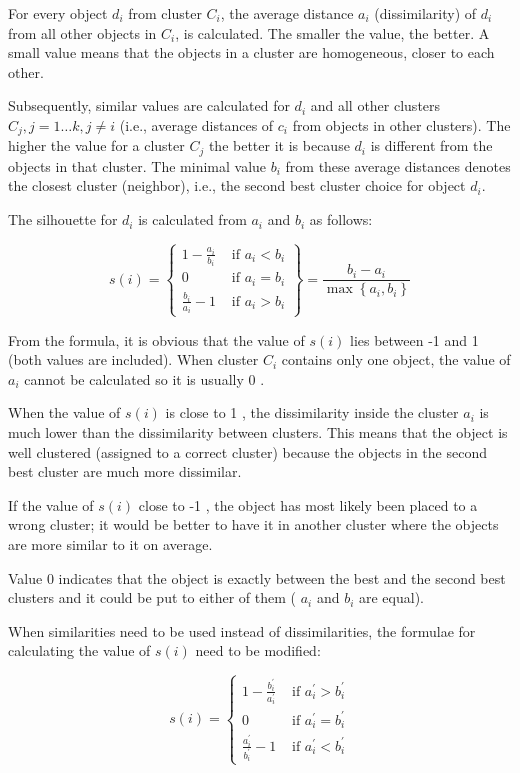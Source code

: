 \documentclass[10pt]{book}
\begin{document}
For every object $d_{i}$ from cluster $C_{i}$, the average distance $a_{i}$ (dissimilarity) of $d_{i}$ from all other objects in $C_{i}$, is calculated. The smaller the value, the better. A small value means that the objects in a cluster are homogeneous, closer to each other.

Subsequently, similar values are calculated for $d_{i}$ and all other clusters $C_{j}, j=1 \ldots k, j \neq i$ (i.e., average distances of $c_{i}$ from objects in other clusters). The higher the value for a cluster $C_{j}$ the better it is because $d_{i}$ is different from the objects in that cluster. The minimal value $b_{i}$ from these average distances denotes the closest cluster (neighbor), i.e., the second best cluster choice for object $d_{i}$.

The silhouette for $d_{i}$ is calculated from $a_{i}$ and $b_{i}$ as follows:

\[
s(i)=\left\{\begin{array}{ll}
1-\frac{a_{i}}{b_{i}} & \text { if } a_{i}<b_{i}  \tag{12.55}\\
0 & \text { if } a_{i}=b_{i} \\
\frac{b_{i}}{a_{i}}-1 & \text { if } a_{i}>b_{i}
\end{array}\right\}=\frac{b_{i}-a_{i}}{\max \left\{a_{i}, b_{i}\right\}}
\]

From the formula, it is obvious that the value of $s(i)$ lies between -1 and 1 (both values are included). When cluster $C_{i}$ contains only one object, the value of $a_{i}$ cannot be calculated so it is usually 0 .

When the value of $s(i)$ is close to 1 , the dissimilarity inside the cluster $a_{i}$ is much lower than the dissimilarity between clusters. This means that the object is well clustered (assigned to a correct cluster) because the objects in the second best cluster are much more dissimilar.

If the value of $s(i)$ close to -1 , the object has most likely been placed to a wrong cluster; it would be better to have it in another cluster where the objects are more similar to it on average.

Value 0 indicates that the object is exactly between the best and the second best clusters and it could be put to either of them ( $a_{i}$ and $b_{i}$ are equal).

When similarities need to be used instead of dissimilarities, the formulae for calculating the value of $s(i)$ need to be modified:

\[
s(i)= \begin{cases}1-\frac{b_{i}^{\prime}}{a_{i}^{\prime}} & \text { if } a_{i}^{\prime}>b_{i}^{\prime}  \tag{12.56}\\ 0 & \text { if } a_{i}^{\prime}=b_{i}^{\prime} \\ \frac{a_{i}^{\prime}}{b_{i}^{\prime}}-1 & \text { if } a_{i}^{\prime}<b_{i}^{\prime}\end{cases}
\]
\end{document}
